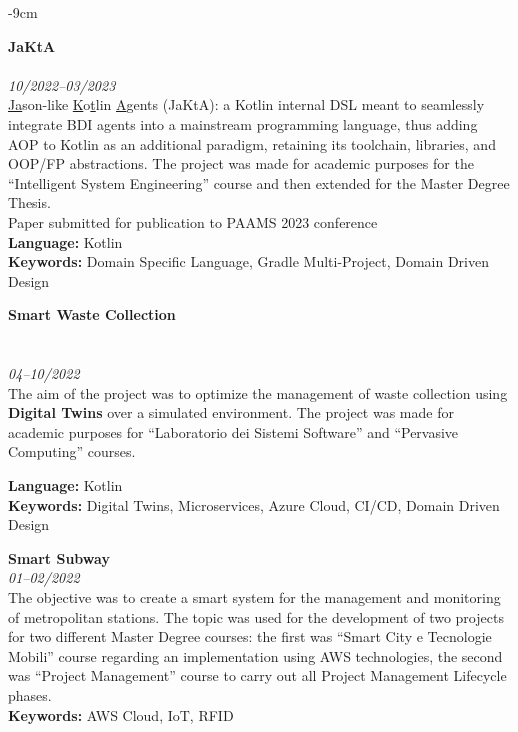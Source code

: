 \documentclass[10pt,a4paper]{altacv}
\begin{document}
\begin{adjustwidth}{}{-9cm}

    \textbf{JaKtA}\\
    \\
    \textit{10/2022--03/2023}\\ \smallskip
    \underline{Ja}son-like \underline{K}o\underline{t}lin \underline{A}gents (JaKtA): a Kotlin internal DSL meant to seamlessly integrate BDI agents into a mainstream programming language, thus adding AOP to Kotlin as an additional paradigm, retaining its toolchain, libraries, and OOP/FP abstractions. The project was made for academic purposes for the ``Intelligent System Engineering'' course and then extended for the Master Degree Thesis.\\ \smallskip
    {\small \notesymbol \hspace{0.5em} Paper submitted for publication to PAAMS 2023 conference}\\
    \smallskip
    \textbf{Language:} Kotlin\\
    \textbf{Keywords:} Domain Specific Language, Gradle Multi-Project, Domain Driven Design

    \divider

    \clearpage

    \textbf{Smart Waste Collection}\\
    \\
    \\
    \textit{04--10/2022}\\ \smallskip
    The aim of the project was to optimize the management of waste collection using \textbf{Digital Twins} over a simulated environment.
    The project was made for academic purposes for ``Laboratorio dei Sistemi Software'' and ``Pervasive Computing'' courses.\\
    \smallskip

    \textbf{Language:} Kotlin\\
    \textbf{Keywords:} Digital Twins, Microservices, Azure Cloud, CI/CD, Domain Driven Design

    \divider

    \textbf{Smart Subway}\\
    \textit{01--02/2022}\\ \smallskip
    The objective was to create a smart system for the management and monitoring of metropolitan stations.
    The topic was used for the development of two projects for two different Master Degree courses: the first was ``Smart City e Tecnologie Mobili'' course regarding an implementation using AWS technologies,
    the second was ``Project Management'' course to carry out all Project Management Lifecycle phases.\\ \smallskip
    \textbf{Keywords:} AWS Cloud, IoT, RFID


\end{adjustwidth}
\end{document}
